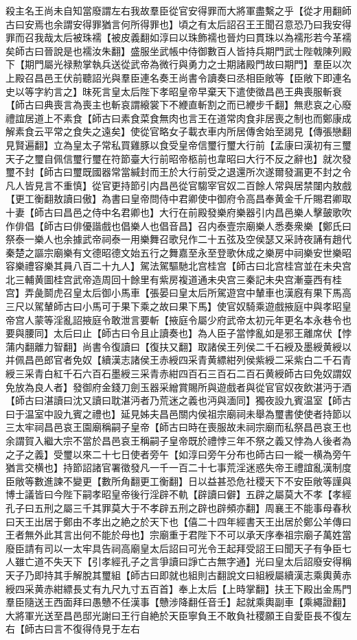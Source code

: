 殺主名王尚未自知當廢謂左右我故羣臣從官安得罪而大將軍盡繫之乎【從才用翻師古曰安焉也余謂安得罪猶言何所得罪也】頃之有太后詔召王王聞召意恐乃曰我安得罪而召我哉太后被珠襦【被皮義翻如淳曰以珠飾襦也晉灼曰貫珠以為襦形若今革襦矣師古曰晉說是也襦汝朱翻】盛服坐武帳中侍御數百人皆持兵期門武士陛戟陳列殿下【期門屬光禄勲掌執兵送從武帝為微行與勇力之士期諸殿門故曰期門】羣臣以次上殿召昌邑王伏前聽詔光與羣臣連名奏王尚書令讀奏曰丞相臣敞等【臣敞下即連名史以等字約言之】昩死言皇太后陛下孝昭皇帝早棄天下遣使徵昌邑王典喪服斬衰【師古曰典喪言為喪主也斬哀謂縗裳下不緶直斬割之而已緶步千翻】無悲哀之心廢禮誼居道上不素食【師古曰素食菜食無肉也言王在道常肉食非居喪之制也而鄭康成解素食云平常之食失之遠矣】使從官略女子載衣車内所居傳舍始至謁見【傳張戀翻見賢遍翻】立為皇太子常私買雞豚以食受皇帝信璽行璽大行前【孟康曰漢初有三璽天子之璽自佩信璽行璽在符節臺大行前昭帝柩前也韋昭曰大行不反之辭也】就次發璽不封【師古曰璽既國器常當緘封而王於大行前受之退還所次遂爾發漏更不封之令凡人皆見言不重慎】從官更持節引内昌邑從官騶宰官奴二百餘人常與居禁闥内敖戲【更工衡翻敖讀曰傲】為書曰皇帝問侍中君卿使中御府令高昌奉黄金千斤賜君卿取十妻【師古曰昌邑之侍中名君卿也】大行在前殿發樂府樂器引内昌邑樂人擊皷歌吹作俳倡【師古曰俳優諧戲也倡樂人也倡音昌】召内泰壹宗廟樂人悉奏衆樂【鄭氏曰祭泰一樂人也余據武帝祠泰一用樂舞召歌兒作二十五弦及空侯瑟又采詩夜誦有趙代秦楚之謳宗廟樂有文德昭德文始五行之舞嘉至永至登歌休成之樂房中祠樂安世樂昭容樂禮容樂其員八百二十九人】駕法駕驅馳北宫桂宫【師古曰北宫桂宫並在未央宫北三輔黄圖桂宫武帝造周回十餘里有紫房複道通未央宫三秦記未央宫漸臺西有桂宫】弄彘鬬虎召皇太后御小馬車【張晏曰皇太后所駕遊宫中輦車也漢廐有果下馬高三尺以駕輦師古曰小馬可于果下乘之故曰果下馬】使官奴騎乘遊戲掖庭中與孝昭皇帝宫人蒙等淫亂詔掖庭令敢泄言要斬【掖庭令屬少府武帝太初元年更名本永巷令也要與腰同】太后曰止【師古曰令且止讀奏也】為人臣子當悖亂如是邪王離席伏【悖蒲内翻離力智翻】尚書令復讀曰【復扶又翻】取諸侯王列侯二千石綬及墨綬黄綬以并佩昌邑郎官者免奴【續漢志諸侯王赤綬四采青黄縹紺列侯紫綬二采紫白二千石青綬三采青白紅千石六百石墨綬三采青赤紺四百石三百石二百石黄綬師古曰免奴謂奴免放為良人者】發御府金錢刀劍玉器采繒賞賜所與遊戲者與從官官奴夜飲湛沔于酒【師古曰湛讀曰沈又讀曰耽湛沔者乃荒迷之義也沔與湎同】獨夜設九賓温室【師古曰于温室中設九賓之禮也】延見姊夫昌邑關内侯祖宗廟祠未舉為璽書使使者持節以三太牢祠昌邑哀王園廟稱嗣子皇帝【師古曰時在喪服故未祠宗廟而私祭昌邑哀王也余謂賀入繼大宗不當於昌邑哀王稱嗣子皇帝既於禮悖三年不祭之義又悖為人後者為之子之義】受璽以來二十七日使者旁午【如淳曰旁午分布也師古曰一縱一横為旁午猶言交横也】持節詔諸官署徵發凡一千一百二十七事荒淫迷惑失帝王禮誼亂漢制度臣敞等數進諫不變更【數所角翻更工衡翻】日以益甚恐危社稷天下不安臣敞等謹與博士議皆曰今陛下嗣孝昭皇帝後行淫辟不軌【辟讀曰僻】五辟之屬莫大不孝【孝經孔子曰五刑之屬三千其罪莫大于不孝辟五刑之辟也辟頻亦翻】周襄王不能事母春秋曰天王出居于鄭由不孝出之絶之於天下也【僖二十四年經書天王出居於鄭公羊傳曰王者無外此其言出何不能於母也】宗廟重于君陛下不可以承天序奉祖宗廟子萬姓當廢臣請有司以一太牢具告祠高廟皇太后詔曰可光令王起拜受詔王曰聞天子有争臣七人雖亡道不失天下【引孝經孔子之言爭讀曰諍亡古無字通】光曰皇太后詔廢安得稱天子乃即持其手解脫其璽組【師古曰即就也組則古翻說文曰組綬屬續漢志乘輿黄赤綬四采黄赤紺縹長丈有九尺九寸五百首】奉上太后【上時掌翻】扶王下殿出金馬門羣臣隨送王西面拜曰愚戇不任漢事【戇涉降翻任音壬】起就乘輿副車【乘繩證翻】大將軍光送至昌邑邸光謝曰王行自絶於天臣寧負王不敢負社稷願王自愛臣長不復左右【師古曰言不復得侍見于左右